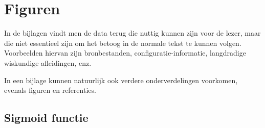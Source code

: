 \chapter{Figuren}
\label{app:A}
In de bijlagen vindt men de data terug die nuttig kunnen zijn voor de
lezer, maar die niet essentieel zijn om het betoog in de normale tekst te
kunnen volgen. Voorbeelden hiervan zijn bronbestanden,
configuratie-informatie, langdradige wiskundige afleidingen, enz.

In een bijlage kunnen natuurlijk ook verdere onderverdelingen voorkomen,
evenals figuren en referenties.

\section{Sigmoid functie}


